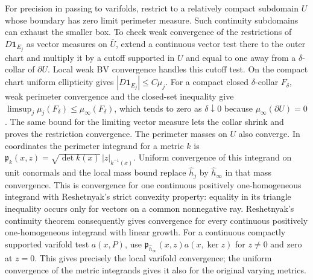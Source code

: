 For precision in passing to varifolds, restrict to a relatively compact
subdomain $U$ whose boundary has zero limit perimeter measure.  Such
continuity subdomains can exhaust the smaller box.  To check weak
convergence of the restrictions of $D\mathbf1_{E_j}$ as vector measures
on $\overline U$, extend a continuous vector test there to the outer
chart and multiply it by a cutoff supported in $U$ and equal to one away
from a $\delta$-collar of $\partial U$.  Local weak BV convergence
handles this cutoff test.  On the compact chart uniform ellipticity
gives $|D\mathbf1_{E_j}|\le C\mu_j$.  For a compact closed
$\delta$-collar $F_\delta$, weak perimeter convergence and the closed-set
inequality give
$\limsup_j\mu_j(F_\delta)\le\mu_\infty(F_\delta)$, which tends to zero
as $\delta\downarrow0$ because $\mu_\infty(\partial U)=0$.  The same
bound for the limiting vector measure lets the collar shrink and proves
the restriction convergence.  The perimeter masses on $U$ also converge.
In coordinates the perimeter
integrand for a metric $k$ is
$\mathfrak p_k(x,z)=\sqrt{\det k(x)}\,|z|_{k^{-1}(x)}$.
Uniform convergence of this integrand on unit conormals and the local
mass bound replace $\widehat h_j$ by $\widehat h_\infty$ in that mass
convergence.  This is convergence for one continuous positively
one-homogeneous integrand with Reshetnyak's strict convexity property:
equality in its triangle inequality occurs only for vectors on a common
nonnegative ray.  Reshetnyak's continuity theorem
\cite[Section~4, Theorem~3]{Reshetnyak1968} consequently gives convergence
for every continuous positively one-homogeneous integrand with linear
growth.  For a continuous compactly supported varifold test $a(x,P)$, use
$\mathfrak p_{\widehat h_\infty}(x,z)a(x,\ker z)$ for $z\ne0$ and zero
at $z=0$.  This gives precisely the local varifold convergence; the
uniform convergence of the metric integrands gives it also for the
original varying metrics.

